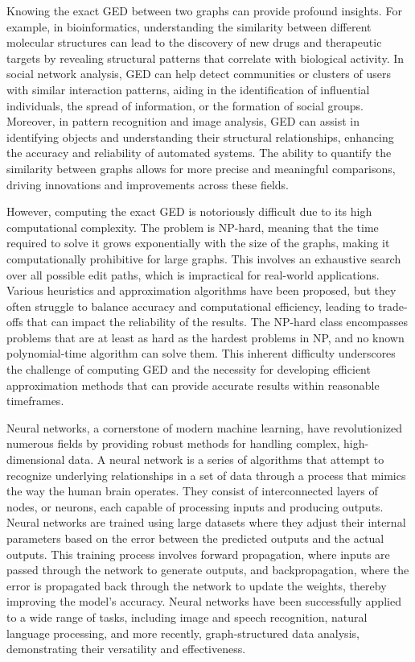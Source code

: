 \documentclass[../Thesis.tex]{subfiles}
\begin{document}
	Knowing the exact GED between two graphs can provide profound insights. For example, in bioinformatics, understanding the similarity between different molecular structures can lead to the discovery of new drugs and therapeutic targets by revealing structural patterns that correlate with biological activity. In social network analysis, GED can help detect communities or clusters of users with similar interaction patterns, aiding in the identification of influential individuals, the spread of information, or the formation of social groups. Moreover, in pattern recognition and image analysis, GED can assist in identifying objects and understanding their structural relationships, enhancing the accuracy and reliability of automated systems. The ability to quantify the similarity between graphs allows for more precise and meaningful comparisons, driving innovations and improvements across these fields.
	
	However, computing the exact GED is notoriously difficult due to its high computational complexity. The problem is NP-hard, meaning that the time required to solve it grows exponentially with the size of the graphs, making it computationally prohibitive for large graphs. This involves an exhaustive search over all possible edit paths, which is impractical for real-world applications. Various heuristics and approximation algorithms have been proposed, but they often struggle to balance accuracy and computational efficiency, leading to trade-offs that can impact the reliability of the results. The NP-hard class encompasses problems that are at least as hard as the hardest problems in NP, and no known polynomial-time algorithm can solve them. This inherent difficulty underscores the challenge of computing GED and the necessity for developing efficient approximation methods that can provide accurate results within reasonable timeframes.
	
	Neural networks, a cornerstone of modern machine learning, have revolutionized numerous fields by providing robust methods for handling complex, high-dimensional data. A neural network is a series of algorithms that attempt to recognize underlying relationships in a set of data through a process that mimics the way the human brain operates. They consist of interconnected layers of nodes, or neurons, each capable of processing inputs and producing outputs. Neural networks are trained using large datasets where they adjust their internal parameters based on the error between the predicted outputs and the actual outputs. This training process involves forward propagation, where inputs are passed through the network to generate outputs, and backpropagation, where the error is propagated back through the network to update the weights, thereby improving the model's accuracy. Neural networks have been successfully applied to a wide range of tasks, including image and speech recognition, natural language processing, and more recently, graph-structured data analysis, demonstrating their versatility and effectiveness.
	
\end{document}
